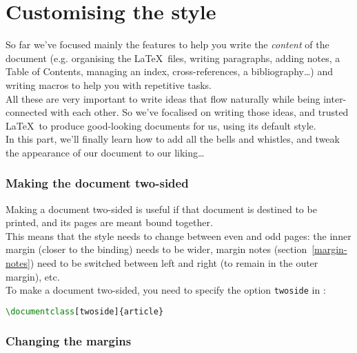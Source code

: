 
\part{Customising the style}

So far we've focused mainly the features to help you write the \emph{content} of the document (e.g. organising the \LaTeX\ files, writing paragraphs, adding notes, a Table of Contents, managing an index, cross-references, a bibliography\dots) and writing macros to help you with repetitive tasks. \\

All these are very important to write ideas that flow naturally while being inter-connected with each other. So we've focalised on writing those ideas, and trusted \LaTeX\ to produce good-looking documents for us, using its default style. \\

In this part, we'll finally learn how to add all the bells and whistles, and tweak the appearance of our document to our liking\dots



\section{Making the document two-sided} \label{two-sided}

Making a document two-sided is useful if that document is destined to be printed, and its pages are meant bound together. \\

This means that the style needs to change between even and odd pages: the inner margin (closer to the binding) needs to be wider, margin notes (section~\ref{margin-notes}) need to be switched between left and right (to remain in the outer margin), etc. \\

To make a document two-sided, you need to specify the option \texttt{twoside} in :
\begin{lstlisting}[language=tex]
\documentclass[twoside]{article}
\end{lstlisting}


\section{Changing the margins}

